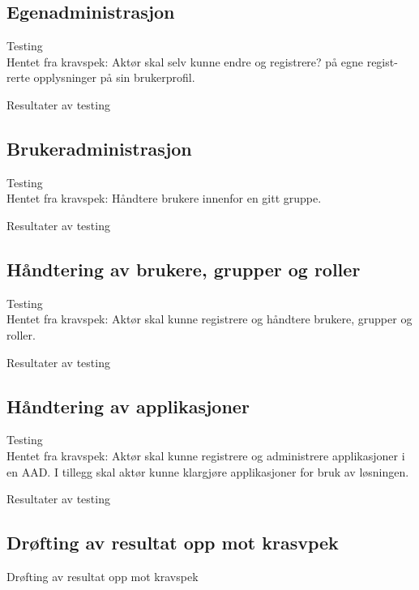 \subsection{Egenadministrasjon}
\label{sec:testing_egenadministrasjon}
Testing \\

Hentet fra kravspek:
Aktør skal selv kunne endre og registrere? på egne regist- rerte opplysninger på sin brukerprofil.

Resultater av testing \\

\subsection{Brukeradministrasjon}
\label{sec:testing_brukeradministrasjon}
Testing \\

Hentet fra kravspek:
Håndtere brukere innenfor en gitt gruppe.

Resultater av testing \\

\subsection{Håndtering av brukere, grupper og roller}
\label{sec:testing_haandteringAvBrukereGrupperOgRoller}
Testing \\

Hentet fra kravspek:
Aktør skal kunne registrere og håndtere brukere, grupper og roller.

Resultater av testing\\

\subsection{Håndtering av applikasjoner}
\label{sec:testing_handteringAvApplikasjoner}
Testing \\

Hentet fra kravspek:
Aktør skal kunne registrere og administrere applikasjoner i en AAD. I tillegg skal aktør kunne klargjøre applikasjoner for bruk av løsningen.

Resultater av testing \\

\subsection{Drøfting av resultat opp mot krasvpek}
\label{sec:testing_droftingAvResultatOppMotKrasvpek}
Drøfting av resultat opp mot kravspek

